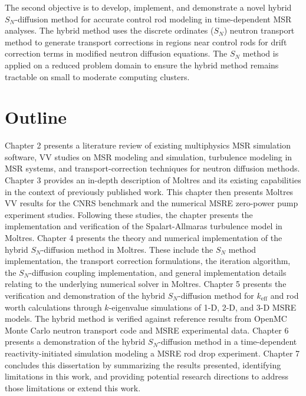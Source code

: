 
    The second objective is to develop, implement, and demonstrate a novel hybrid $S_N$-diffusion
    method for accurate control rod modeling in
    time-dependent \gls{MSR} analyses. The hybrid method uses the discrete ordinates ($S_N$)
    neutron transport method to generate transport corrections in regions near control rods for
    drift correction terms in modified neutron diffusion equations. The $S_N$ method is applied on
    a reduced problem domain to ensure the hybrid method remains tractable on small to moderate
    computing clusters.

\section{Outline}

Chapter 2 presents a literature review of existing multiphysics \gls{MSR} simulation software,
\gls{VV} studies on \gls{MSR} modeling and simulation, turbulence modeling in \gls{MSR} systems,
and transport-correction techniques for neutron diffusion methods.
Chapter 3 provides an in-depth description of Moltres and its existing capabilities in the context
of previously published work. This chapter then presents Moltres \gls{VV} results for the CNRS
benchmark and the numerical \gls{MSRE} zero-power pump experiment studies. Following these studies,
the chapter presents the implementation and verification of the Spalart-Allmaras turbulence model
in Moltres.
Chapter 4 presents the theory and numerical implementation of the hybrid
$S_N$-diffusion method in Moltres. These include the $S_N$ method implementation, the transport
correction formulations, the iteration algorithm, the $S_N$-diffusion coupling implementation, and
general implementation details relating to the underlying numerical solver in Moltres.
Chapter 5 presents the verification and demonstration of the hybrid $S_N$-diffusion method for
$k_\text{eff}$ and rod worth calculations through
$k$-eigenvalue simulations of 1-D, 2-D, and 3-D \gls{MSRE} models. The hybrid method is verified
against reference results from OpenMC Monte Carlo neutron transport code and \gls{MSRE}
experimental data.
Chapter 6 presents a demonstration of the hybrid $S_N$-diffusion method in a time-dependent
reactivity-initiated simulation modeling a \gls{MSRE} rod drop experiment.
Chapter 7 concludes this dissertation by summarizing the results presented, identifying limitations
in this work, and providing potential research directions to address those limitations or extend
this work.
